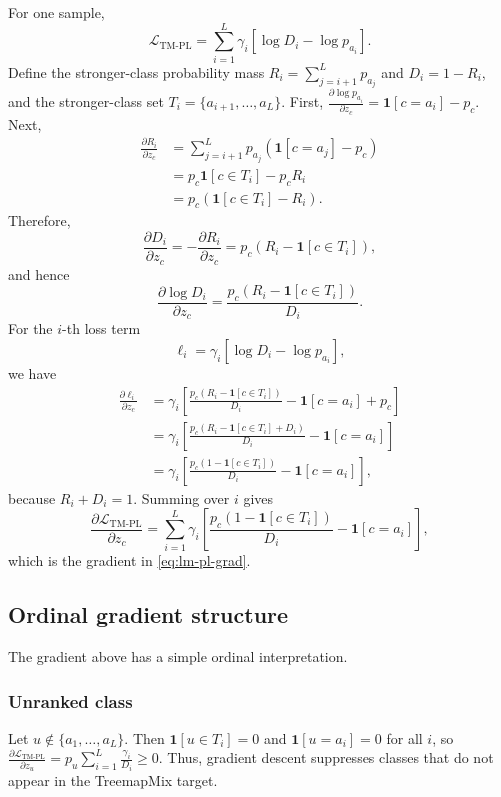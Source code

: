 For one sample,
\[
\mathcal{L}_{\mathrm{TM\text{-}PL}}
=
\sum_{i=1}^{L}
\gamma_i
\left[
\log D_i-\log p_{a_i}
\right].
\]
Define the stronger-class probability mass \(R_i=\sum_{j=i+1}^{L}p_{a_j}\) and \(D_i=1-R_i\), and the stronger-class set \(T_i=\{a_{i+1},\dots,a_L\}\). First, \(\frac{\partial \log p_{a_i}}{\partial z_c}=\mathbf{1}[c=a_i]-p_c\).
Next,
\[
\begin{aligned}
\frac{\partial R_i}{\partial z_c}
&=
\sum_{j=i+1}^{L}
p_{a_j}
\left(
\mathbf{1}[c=a_j]-p_c
\right) \\
&=
p_c\mathbf{1}[c\in T_i]-p_cR_i \\
&=
p_c\left(\mathbf{1}[c\in T_i]-R_i\right).
\end{aligned}
\]
Therefore,
\[
\frac{\partial D_i}{\partial z_c}
=
-\frac{\partial R_i}{\partial z_c}
=
p_c\left(R_i-\mathbf{1}[c\in T_i]\right),
\]
and hence
\[
\frac{\partial \log D_i}{\partial z_c}
=
\frac{
p_c\left(R_i-\mathbf{1}[c\in T_i]\right)
}{
D_i
}.
\]
For the $i$-th loss term
\[
\ell_i
=
\gamma_i
\left[
\log D_i-\log p_{a_i}
\right],
\]
we have
\[
\begin{aligned}
\frac{\partial \ell_i}{\partial z_c}
&=
\gamma_i
\left[
\frac{
p_c\left(R_i-\mathbf{1}[c\in T_i]\right)
}{
D_i
}
-
\mathbf{1}[c=a_i]
+
p_c
\right] \\
&=
\gamma_i
\left[
\frac{
p_c\left(R_i-\mathbf{1}[c\in T_i]+D_i\right)
}{
D_i
}
-
\mathbf{1}[c=a_i]
\right] \\
&=
\gamma_i
\left[
\frac{
p_c\left(1-\mathbf{1}[c\in T_i]\right)
}{
D_i
}
-
\mathbf{1}[c=a_i]
\right],
\end{aligned}
\]
because $R_i+D_i=1$. Summing over $i$ gives
\[
\frac{\partial \mathcal{L}_{\mathrm{TM\text{-}PL}}}{\partial z_c}
=
\sum_{i=1}^{L}
\gamma_i
\left[
\frac{
p_c\left(1-\mathbf{1}[c\in T_i]\right)
}{
D_i
}
-
\mathbf{1}[c=a_i]
\right],
\]
which is the gradient in \eqref{eq:lm-pl-grad}.

\subsection{Ordinal gradient structure}

The gradient above has a simple ordinal interpretation.

\subsubsection*{Unranked class}

Let $u\notin\{a_1,\dots,a_L\}$. Then \(\mathbf{1}[u\in T_i]=0\) and \(\mathbf{1}[u=a_i]=0\) for all $i$, so \(\frac{\partial \mathcal{L}_{\mathrm{TM\text{-}PL}}}{\partial z_u}=p_u\sum_{i=1}^{L}\frac{\gamma_i}{D_i}\ge 0\).
Thus, gradient descent suppresses classes that do not appear in the TreemapMix target.

